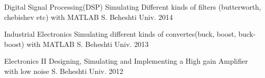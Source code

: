 \begin{cvhonors}
  \cvhonor
    {Digital Signal Processing(DSP)} %
    {Simulating Different kinds of filters (butterworth, chebishev etc) with MATLAB} %
    {S. Beheshti Univ.} %
    {2014} %



  \cvhonor
    {Industrial Electronics} %
    {Simulating different kinds of convertes(buck, boost, buck- boost) with MATLAB} %
    {S. Beheshti Univ.} %
    {2013} %


  \cvhonor
    {Electronics II} %
    {Designing, Simulating and Implementing a High gain Amplifier with low noise} %
    {S. Beheshti Univ.} %
    {2012} %

\end{cvhonors}
